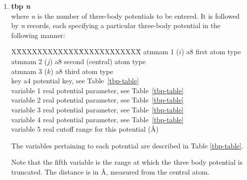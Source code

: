 \begin{enumerate}
\item {\bf tbp {\em n}} \\
where {\em n} is the number of three-body potentials to be
entered.  It is followed by {\em n} records, each specifying a
particular three-body potential in the following manner:
\begin{tabbing}
X\=XXXXXXXXXXXX\=XXXXXXXXXXXX\=\kill
\> atmnam 1 ($i$) \> a8   \> first atom type \\
\> atmnam 2 ($j$) \> a8   \> second (central) atom type \\
\> atmnam 3 ($k$) \> a8   \> third atom type \\
\> key            \> a4   \> potential key, see Table~\ref{tbp-table} \\
\> variable 1     \> real \> potential parameter, see Table~\ref{tbp-table} \\
\> variable 2     \> real \> potential parameter, see Table~\ref{tbp-table} \\
\> variable 3     \> real \> potential parameter, see Table~\ref{tbp-table} \\
\> variable 4     \> real \> potential parameter, see Table~\ref{tbp-table} \\
\> variable 5     \> real \> cutoff range for this potential (\AA)
\end{tabbing}
The variables pertaining to each potential are described in Table
\ref{tbp-table}.

Note that the fifth variable is the range at which the three
body potential is truncated.  The
distance is in \AA, measured from the central atom.


\end{enumerate}
